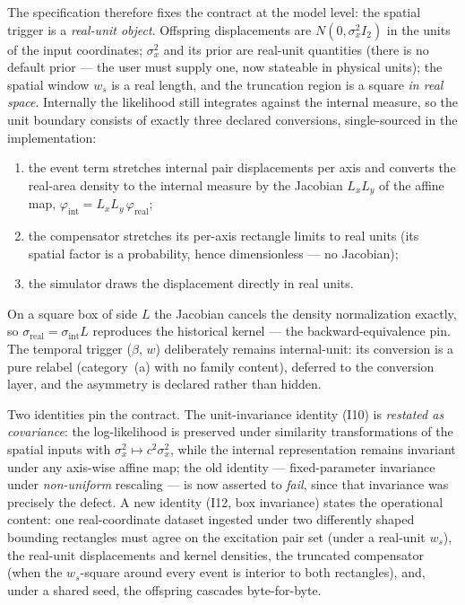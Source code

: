 The specification therefore fixes the contract at the model level: the
spatial trigger is a \emph{real-unit object}. Offspring displacements are
$N(0,\sigma_x^2 I_2)$ in the units of the input coordinates; $\sigma_x^2$
and its prior are real-unit quantities (there is no default prior --- the
user must supply one, now stateable in physical units); the spatial window
$w_s$ is a real length, and the truncation region is a square \emph{in real
space}. Internally the likelihood still integrates against the internal
measure, so the unit boundary consists of exactly three declared
conversions, single-sourced in the implementation:
\begin{enumerate}[label=(\roman*)]
  \item the event term stretches internal pair displacements per axis and
        converts the real-area density to the internal measure by the
        Jacobian $L_x L_y$ of the affine map,
        $\varphi_{\mathrm{int}} = L_x L_y\, \varphi_{\mathrm{real}}$;
  \item the compensator stretches its per-axis rectangle limits to real
        units (its spatial factor is a probability, hence dimensionless ---
        no Jacobian);
  \item the simulator draws the displacement directly in real units.
\end{enumerate}
On a square box of side $L$ the Jacobian cancels the density normalization
exactly, so $\sigma_{\mathrm{real}} = \sigma_{\mathrm{int}} L$ reproduces
the historical kernel --- the backward-equivalence pin. The temporal trigger
($\beta$, $w$) deliberately remains internal-unit: its conversion is a pure
relabel (category~(a) with no family content), deferred to the conversion
layer, and the asymmetry is declared rather than hidden.

Two identities pin the contract. The unit-invariance identity (I10) is
\emph{restated as covariance}: the log-likelihood is preserved under
similarity transformations of the spatial inputs with
$\sigma_x^2 \mapsto c^2 \sigma_x^2$, while the internal representation
remains invariant under any axis-wise affine map; the old identity ---
fixed-parameter invariance under \emph{non-uniform} rescaling --- is now
asserted to \emph{fail}, since that invariance was precisely the defect. A
new identity (I12, box invariance) states the operational content: one
real-coordinate dataset ingested under two differently shaped bounding
rectangles must agree on the excitation pair set (under a real-unit $w_s$),
the real-unit displacements and kernel densities, the truncated compensator
(when the $w_s$-square around every event is interior to both rectangles),
and, under a shared seed, the offspring cascades byte-for-byte.

